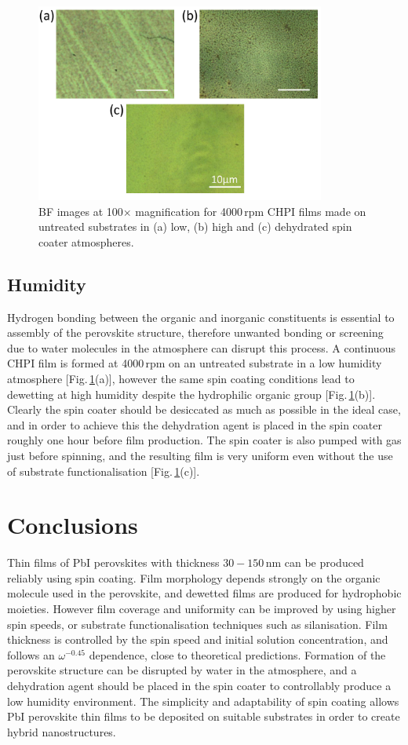 \begin{figure}[] 
\centering    
\includegraphics[width=0.85\textwidth]{Fig8}
\caption{BF images at 100$\times$ magnification for 4000\,rpm CHPI films made on untreated substrates in (a) low, (b) high and (c) dehydrated spin coater atmospheres.}
\label{4Fig8}
\end{figure}
\subsection{Humidity}
Hydrogen bonding between the organic and inorganic constituents is essential to assembly of the perovskite structure, therefore unwanted bonding or screening due to water molecules in the atmosphere can disrupt this process. A continuous CHPI film is formed at 4000\,rpm on an untreated substrate in a low humidity atmosphere [Fig.\,\ref{4Fig8}(a)], however the same spin coating conditions lead to dewetting at high humidity despite the hydrophilic organic group [Fig.\,\ref{4Fig8}(b)]. Clearly the spin coater should be desiccated as much as possible in the ideal case, and in order to achieve this the dehydration agent  is placed in the spin coater roughly one hour before film production. The spin coater is also pumped with  gas just before spinning, and the resulting film is very uniform even without the use of substrate functionalisation [Fig.\,\ref{4Fig8}(c)].


\section{Conclusions}
Thin films of PbI perovskites with thickness $30-150$\,nm can be produced reliably using spin coating. Film morphology depends strongly on the organic molecule used in the perovskite, and dewetted films are produced for hydrophobic moieties. However film coverage and uniformity can be improved by using higher spin speeds, or substrate functionalisation techniques such as silanisation. Film thickness is controlled by the spin speed and initial solution concentration, and follows an $\omega^{-0.45}$ dependence, close to theoretical predictions. Formation of the perovskite structure can be disrupted by water in the atmosphere, and a dehydration agent should be placed in the spin coater to controllably produce a low humidity environment. The simplicity and adaptability of spin coating allows PbI perovskite thin films to be deposited on suitable substrates in order to create hybrid nanostructures.